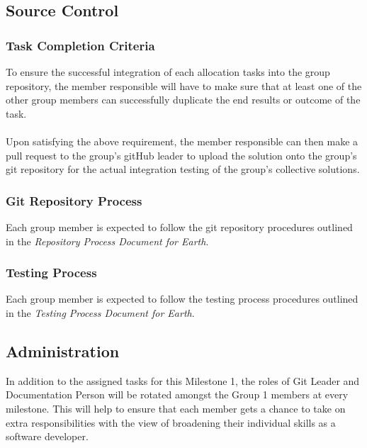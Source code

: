 \documentclass[10pt,a4,oneside]{article}
\begin{document}
\subsection{Source Control}

\subsubsection{Task Completion Criteria}

\noindent To ensure the successful integration of each allocation tasks into the group repository, the member responsible will have to make sure that at least one of the other group members can successfully duplicate the end results or outcome of the task.

\paragraph{}
\noindent Upon satisfying the above requirement, the member responsible can then make a pull request to the group's gitHub leader to upload the solution onto the group's git repository for the actual integration testing of the group's collective solutions. 


\subsubsection{Git Repository Process}

\noindent Each group member is expected to follow the git repository procedures outlined in the \emph{Repository Process Document for Earth}.
 

\subsubsection{Testing Process}
\noindent Each group member is expected to follow the testing process procedures outlined in the \emph{Testing Process Document for Earth}.


\subsection{Administration}

In addition to the assigned tasks for this Milestone 1, the roles of Git Leader and Documentation Person will be rotated amongst the Group 1 members at every milestone. This will help to ensure that each member gets a chance to take on extra responsibilities with the view of broadening their individual skills as a software developer.
\end{document}
